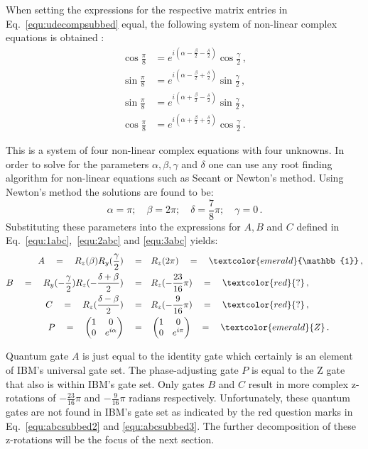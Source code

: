 \newpage
When setting the expressions for the respective matrix entries in Eq.~\ref{equ:udecompsubbed} equal, the following system of non-linear complex equations is obtained :
\begin{align}
\label{equ:nlsystem}
\cos\frac{\pi}{8} &= e^{i(\alpha-\frac{\beta}{2}-\frac{\delta}{2})}\cos{\frac{\gamma}{2}}\, ,\\
\sin\frac{\pi}{8} &= e^{i(\alpha-\frac{\beta}{2}+\frac{\delta}{2})}\sin{\frac{\gamma}{2}}\, ,  \\
\sin\frac{\pi}{8} &= e^{i(\alpha+\frac{\beta}{2}-\frac{\delta}{2})}\sin{\frac{\gamma}{2}}\, ,\\
\cos\frac{\pi}{8} &= e^{i(\alpha+\frac{\beta}{2}+\frac{\delta}{2})}\cos{\frac{\gamma}{2}}\, .
\end{align}


This is a system of four non-linear complex equations with four unknowns. In order to solve for the parameters $\alpha,\beta,\gamma$ and $\delta$ one can use any root finding algorithm for non-linear equations such as Secant or Newton's method. Using Newton's method the solutions are found to be:
\begin{equation}
\alpha =  \pi; \quad 
\beta = 2\pi;\quad 
\delta = \frac{7}{8}\pi;\quad 
\gamma = 0\, .
\end{equation}
Substituting these parameters into the expressions for $A,B$ and $C$ defined in Eq.~\ref{equ:1abc},~\ref{equ:2abc} and \ref{equ:3abc} yields:
\begin{align}
\label{equ:abcsubbed1}
A \quad= \quad R_z(\beta)R_y(\frac{\gamma}{2})\quad =& \quad R_z(2\pi) \quad = \quad \textcolor{emerald}{\mathbb{1}}\, , \\
\label{equ:abcsubbed2}
B\quad =\quad R_y(-\frac{\gamma}{2})R_z(-\frac{\delta+\beta}{2})\quad =& \quad R_z(-\frac{23}{16}\pi) \quad= \quad \textcolor{red}{?} \, ,\\
\label{equ:abcsubbed3}
C \quad=\quad R_z(\frac{\delta-\beta}{2})\quad =& \quad R_z(-\frac{9}{16}\pi) \quad= \quad \textcolor{red}{?}\, , \\
\label{equ:abcsubbed4}
P\quad =\quad \begin{pmatrix} 1&0\cr0&e^{i\alpha} \end{pmatrix}\quad=& \quad \begin{pmatrix} 1&0\cr0&e^{i\pi} \end{pmatrix}\quad= \quad \textcolor{emerald}{Z}\, .
\end{align}


Quantum gate $A$ is just equal to the identity gate which certainly is an element of IBM's universal gate set. The phase-adjusting gate $P$ is equal to the Z gate that also is within IBM's gate set. Only gates $B$ and $C$ result in more complex z-rotations of $-\frac{23}{16}\pi$ and $-\frac{9}{16}\pi$ radians respectively. Unfortunately, these quantum gates are not found in IBM's gate set as indicated by the red question marks in Eq.~\ref{equ:abcsubbed2} and \ref{equ:abcsubbed3}. The further decomposition of these z-rotations will be the focus of the next section.

